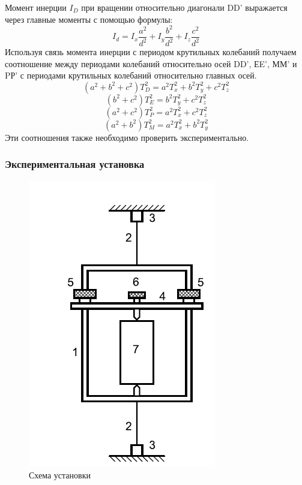 \documentclass[a4paper,12pt]{article}
\begin{document}
Момент инерции $I_{D}$ при вращении относительно диагонали DD' выражается
 через главные моменты с помощью формулы:
\begin{equation}
    I_{d}=I_{x}\frac{a^2}{d^2}+I_{y}\frac{b^2}{d^2}+I_{z}\frac{c^2}{d^2}
\end{equation}
Используя связь момента инерции с периодом крутильных колебаний
получаем соотношение между периодами колебаний относительно осей DD', ЕE',
ММ' и PР' с периодами крутильных колебаний относительно главных осей.
\begin{equation}
    \label{1}
    (a^2+b^2+c^2)T^2_{D}=a^2 T^2_{x}+b^2 T^2_{y}+c^2 T^2_{z}
\end{equation}
\begin{equation}
    \label{2}
    (b^2+c^2)T^2_{E}=b^2 T^2_{y}+c^2 T^2_{z}
\end{equation}
\begin{equation}
    \label{3}
    (a^2+c^2)T^2_{P}=a^2 T^2_{x}+c^2 T^2_{z}
\end{equation}
\begin{equation}
    \label{4}
    (a^2+b^2)T^2_{M}=a^2 T^2_{x}+b^2 T^2_{y}
\end{equation}
Эти соотношения также необходимо проверить экспериментально.

\subsubsection*{Экспериментальная установка}

\begin{figure}[!h]
    \begin{center}
        \includegraphics[scale=1]{ystanovka}
        \caption{Схема установки}
        \label{graphic1}
    \end{center}
\end{figure}
\end{document}
